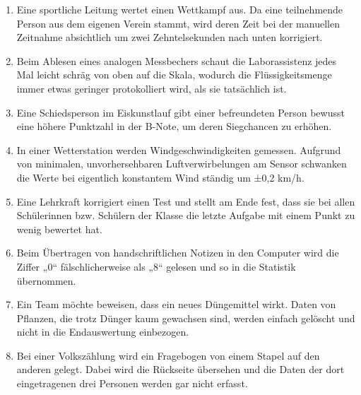 \begin{enumerate}
\item
Eine sportliche Leitung wertet einen Wettkampf aus. Da eine teilnehmende Person aus dem eigenen Verein stammt, wird deren
    Zeit bei der manuellen Zeitnahme absichtlich um zwei Zehntelsekunden nach unten korrigiert. 

\item
Beim Ablesen eines analogen Messbechers schaut die Laborassistenz jedes Mal leicht schräg von oben auf die Skala,
    wodurch die Flüssigkeitsmenge immer etwas geringer protokolliert wird, als sie tatsächlich ist. 

\item
Eine Schiedsperson im Eiskunstlauf gibt einer befreundeten Person bewusst eine höhere Punktzahl in der B-Note,
    um deren Siegchancen zu erhöhen. 

\item
In einer Wetterstation werden Windgeschwindigkeiten gemessen. Aufgrund von minimalen, unvorhersehbaren Luftverwirbelungen
    am Sensor schwanken die Werte bei eigentlich konstantem Wind ständig um ±0,2 km/h. 

\item
Eine Lehrkraft korrigiert einen Test und stellt am Ende fest, dass sie bei allen Schülerinnen bzw. Schülern der Klasse die letzte
    Aufgabe mit einem Punkt zu wenig bewertet hat. 

\item
Beim Übertragen von handschriftlichen Notizen in den Computer wird die Ziffer „0“ fälschlicherweise als „8“ gelesen und so
    in die Statistik übernommen. 

\item
Ein Team möchte beweisen, dass ein neues Düngemittel wirkt. Daten von Pflanzen, die trotz Dünger kaum gewachsen sind,
    werden einfach gelöscht und nicht in die Endauswertung einbezogen. 

\item
Bei einer Volkszählung wird ein Fragebogen von einem Stapel auf den anderen gelegt. Dabei wird die Rückseite übersehen und
    die Daten der dort eingetragenen drei Personen werden gar nicht erfasst. 


\end{enumerate}
